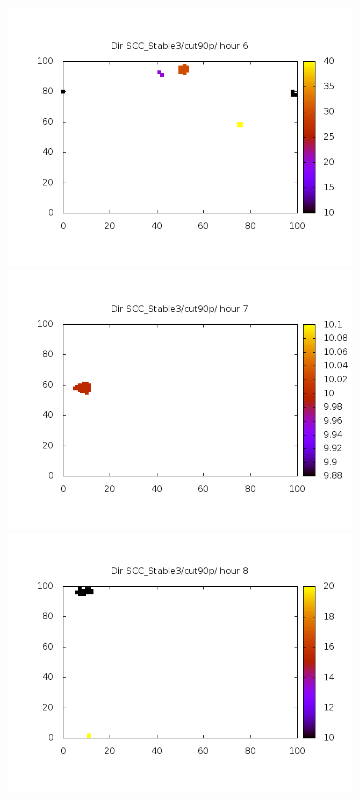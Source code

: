 \documentclass[10pt,a4paper]{article}
\begin{document}
\begin{figure}
\begin{subfigure}[b]{1\textwidth}
\includegraphics[scale=.20]{./img/SCC_Stable3/cut90p/6.png}
\includegraphics[scale=.20]{./img/SCC_Stable3/cut90p/7.png}
\includegraphics[scale=.20]{./img/SCC_Stable3/cut90p/8.png}

\end{subfigure}
\end{figure}
\end{document}
